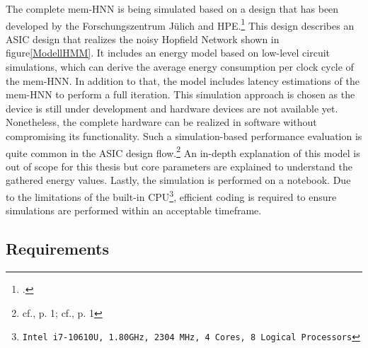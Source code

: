 The complete \ac{mem-HNN} is being simulated based on a design that has been developed by the Forschungszentrum Jülich and HPE.\footcite[cf.][3-4]{hizzaniMemristorbasedHardwareAlgorithms2023}  
This design describes an \ac{ASIC} design that realizes the noisy Hopfield Network shown in figure\ref{ModellHMM}.
It includes an energy model based on low-level circuit simulations, which can derive the average energy consumption per clock cycle of the \ac{mem-HNN}.
In addition to that, the model includes latency estimations of the \ac{mem-HNN} to perform a full iteration. 
This simulation approach is chosen as the device is still under development and hardware devices are not available yet.
Nonetheless, the complete hardware can be realized in software without compromising its functionality.
Such a simulation-based performance evaluation is quite common in the \ac{ASIC} design flow.\footnote{cf.\cite{raoUltimateGuideASIC}, p. 1; cf.\cite{ASICDesignFlow}, p. 1}
An in-depth explanation of this model is out of scope for this thesis but core parameters are explained to understand the gathered energy values.
Lastly, the simulation is performed on a notebook.
Due to the limitations of the built-in \ac{CPU}\footnote{\texttt{Intel i7-10610U, 1.80GHz, 2304 MHz, 4 Cores, 8 Logical Processors}}, efficient coding is required to ensure simulations are performed within an acceptable timeframe.

\subsection{Requirements}

